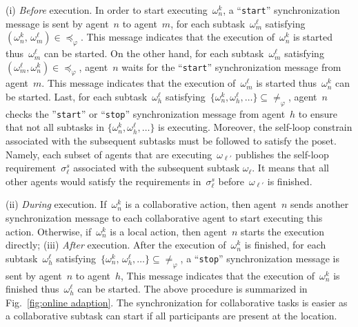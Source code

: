 (i) \emph{Before} execution.
In order to start executing~$\omega^k_n$,
a ``\texttt{start}'' synchronization message is sent by agent~$n$ to agent~$m$,
for each subtask~$\omega^\ell_m$
satisfying~$(\omega^k_n,\,\omega^\ell_m)\in \preceq_{\varphi}$.
This message indicates that the execution of~$\omega^k_n$ is started
thus~$\omega^\ell_m$ can be started.
On the other hand, for each subtask~$\omega^\ell_m$
satisfying~$(\omega^\ell_m, \omega^k_n)\in \preceq_{\varphi}$,
agent~$n$ waits for the ``\texttt{start}'' synchronization message
from agent~$m$.
This message indicates that the execution of~$\omega^\ell_m$ is started
thus~$\omega^k_n$ can be started.
Last, for each subtask~$\omega^\ell_h$
satisfying~$\{\omega^k_n,\omega^\ell_h,\dots\}\subseteq \neq_{\varphi}$,
agent~$n$ checks the ''\texttt{start}'' or ``\texttt{stop}'' synchronization message
from agent~$h$ to ensure that not all subtasks in $\{\omega^k_n,\omega^\ell_h,\dots\}$ is executing.
Moreover, the self-loop constrain associated with the subsequent subtasks must be
followed to satisfy the poset.
Namely, each subset of agents that are executing~$\omega_{\ell'}$ publishes
the self-loop requirement~$\sigma^s_\ell$ associated with the subsequent subtask $\omega_\ell$.
It means that all other agents would satisfy the requirements in~$\sigma^s_\ell$
before~$\omega_{\ell'}$ is finished.


(ii) \emph{During} execution.
If~$\omega^k_n$ is a collaborative action, then
agent~$n$ sends another synchronization message to each collaborative agent
to start executing this action.
Otherwise, if~$\omega^k_n$ is a local action, then agent~$n$ starts the
execution directly;
(iii) \emph{After} execution.
After the execution of~$\omega^k_n$ is finished,
for each subtask~$\omega^\ell_h$
satisfying~$\{\omega^k_n,\,\omega^\ell_h,\dots\}\subseteq \neq_{\varphi}$,
a ``\texttt{stop}'' synchronization message is sent by agent~$n$ to agent~$h$,
This message indicates that the execution of~$\omega^k_n$ is finished
thus~$\omega^\ell_h$ can be started.
The above procedure is summarized in Fig.~\ref{fig:online adaption}.
The synchronization for collaborative tasks is easier as a collaborative
subtask can start if all participants are present at the location.

